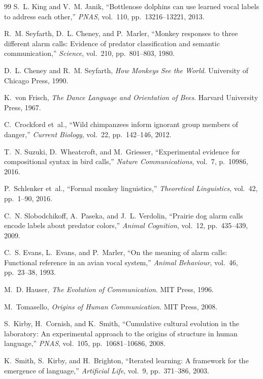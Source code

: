 \begin{thebibliography}{99}
S.~L. King and V.~M. Janik, ``Bottlenose dolphins can use learned vocal labels
to address each other,'' \emph{PNAS}, vol.~110, pp.~13216--13221, 2013.

R.~M. Seyfarth, D.~L. Cheney, and P.~Marler, ``Monkey responses to three
different alarm calls: Evidence of predator classification and semantic
communication,'' \emph{Science}, vol.~210, pp.~801--803, 1980.

D.~L. Cheney and R.~M. Seyfarth, \emph{How Monkeys See the World}.
University of Chicago Press, 1990.

K.~von Frisch, \emph{The Dance Language and Orientation of Bees}.
Harvard University Press, 1967.

C.~Crockford et~al., ``Wild chimpanzees inform ignorant group members of
danger,'' \emph{Current Biology}, vol.~22, pp.~142--146, 2012.

T.~N. Suzuki, D.~Wheatcroft, and M.~Griesser, ``Experimental evidence for
compositional syntax in bird calls,'' \emph{Nature Communications}, vol.~7,
p.~10986, 2016.

P.~Schlenker et~al., ``Formal monkey linguistics,'' \emph{Theoretical
Linguistics}, vol.~42, pp.~1--90, 2016.

C.~N. Slobodchikoff, A.~Paseka, and J.~L. Verdolin, ``Prairie dog alarm calls
encode labels about predator colors,'' \emph{Animal Cognition}, vol.~12,
pp.~435--439, 2009.

C.~S. Evans, L.~Evans, and P.~Marler, ``On the meaning of alarm calls: Functional
reference in an avian vocal system,'' \emph{Animal Behaviour}, vol.~46,
pp.~23--38, 1993.

M.~D. Hauser, \emph{The Evolution of Communication}. MIT Press, 1996.

M.~Tomasello, \emph{Origins of Human Communication}. MIT Press, 2008.

S.~Kirby, H.~Cornish, and K.~Smith, ``Cumulative cultural evolution in the
laboratory: An experimental approach to the origins of structure in human
language,'' \emph{PNAS}, vol.~105, pp.~10681--10686, 2008.

K.~Smith, S.~Kirby, and H.~Brighton, ``Iterated learning: A framework for the
emergence of language,'' \emph{Artificial Life}, vol.~9, pp.~371--386, 2003.


\end{thebibliography}
